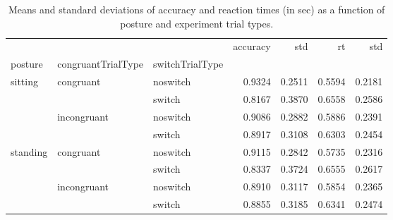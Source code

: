 \begin{table}
\centering
\caption{Means and standard deviations of accuracy and reaction times (in sec) as a function of posture and experiment trial types.}
\label{table-task-switching-replication-reaction-time}
\begin{tabular}{lllrrrr}
\toprule
         &             &        & accuracy &    std &     rt &    std \\
posture & congruantTrialType & switchTrialType &          &        &        &        \\
\midrule
sitting & congruant & noswitch &   0.9324 & 0.2511 & 0.5594 & 0.2181 \\
         &             & switch &   0.8167 & 0.3870 & 0.6558 & 0.2586 \\
         & incongruant & noswitch &   0.9086 & 0.2882 & 0.5886 & 0.2391 \\
         &             & switch &   0.8917 & 0.3108 & 0.6303 & 0.2454 \\
standing & congruant & noswitch &   0.9115 & 0.2842 & 0.5735 & 0.2316 \\
         &             & switch &   0.8337 & 0.3724 & 0.6555 & 0.2617 \\
         & incongruant & noswitch &   0.8910 & 0.3117 & 0.5854 & 0.2365 \\
         &             & switch &   0.8855 & 0.3185 & 0.6341 & 0.2474 \\
\bottomrule
\end{tabular}
\end{table}
